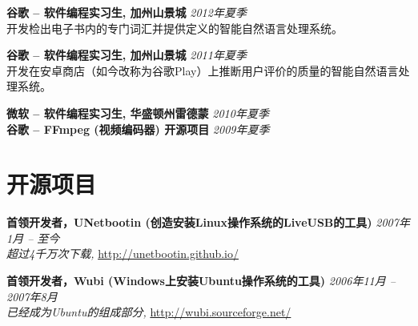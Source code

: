 \documentclass[margin,line]{resume}
\begin{document}
\begin{resume}
\textbf{谷歌 -- 软件编程实习生, 加州山景城} \hfill \textsl{2012年夏季}\\
开发检出电子书内的专门词汇并提供定义的智能自然语言处理系统。

\textbf{谷歌 -- 软件编程实习生, 加州山景城} \hfill \textsl{2011年夏季}\\
开发在安卓商店（如今改称为谷歌Play）上推断用户评价的质量的智能自然语言处理系统。

\textbf{微软 -- 软件编程实习生, 华盛顿州雷德蒙} \hfill \textsl{2010年夏季}\\
\textbf{谷歌 -- FFmpeg (视频编码器) 开源项目} \hfill \textsl{2009年夏季}\\



\vspace{-3mm}

\section{\mysidestyle 开源项目}

\textbf{首领开发者，UNetbootin (创造安装Linux操作系统的LiveUSB的工具)} \hfill \textsl{2007年1月 -- 至今}\\
\emph{超过4千万次下载,} \url{http://unetbootin.github.io/}

\textbf{首领开发者，Wubi (Windows上安装Ubuntu操作系统的工具)} \hfill \textsl{2006年11月 -- 2007年8月}\\
\emph{已经成为Ubuntu的组成部分,} \url{http://wubi.sourceforge.net/}


\end{resume}
\end{document}
